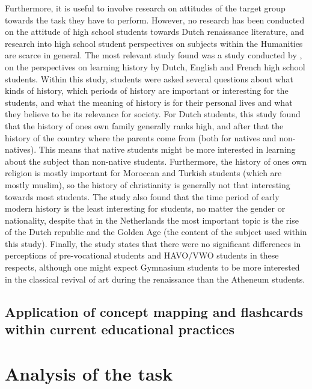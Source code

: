 Furthermore, it is useful to involve research on attitudes of the target group towards the task they have to perform. However, no research has been conducted on the attitude of high school students towards Dutch renaissance literature, and research into high school student perspectives on subjects within the Humanities are scarce in general. The most relevant study found was a study conducted by , on the perspectives on learning history by Dutch, English and French high school students. Within this study, students were asked several questions about what kinds of history, which periods of history are important or interesting for the students, and what the meaning of history is for their personal lives and what they believe to be its relevance for society. For Dutch students, this study found that the history of ones own family generally ranks high, and after that the history of the country where the parents come from (both for natives and non-natives). This means that native students might be more interested in learning about the subject than non-native students. Furthermore, the history of ones own religion is mostly important for Moroccan and Turkish students (which are mostly muslim), so the history of christianity is generally not that interesting towards most students. The study also found that the time period of early modern history is the least interesting for students, no matter the gender or nationality, despite that in the Netherlands the most important topic is the rise of the Dutch republic and the Golden Age (the content of the subject used within this study). Finally, the study states that there were no significant differences in perceptions of pre-vocational students and HAVO/VWO students in these respects, although one might expect Gymnasium students to be more interested in the classical revival of art during the renaissance than the Atheneum students.

\subsection{Application of concept mapping and flashcards within current educational practices}
\label{subsec:fcapplication}


\section{Analysis of the task}
\label{sec:taskanalysis}

